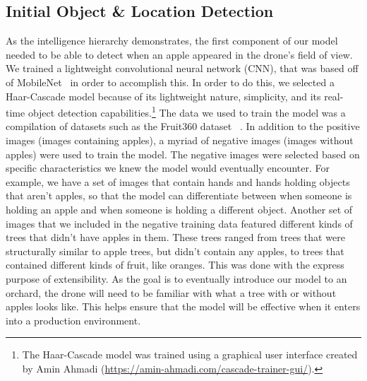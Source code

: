 \subsection{Initial Object \& Location Detection}\label{subsec:initial-object
-&-location-detection}
As the intelligence hierarchy demonstrates, the first component of our model needed
to be able to detect when an apple appeared in the drone's field of view.
We trained a lightweight convolutional neural network (CNN), that was based off of
MobileNet~\cite{Sandler2018,PyTorchMobileNet} in order to accomplish this.
In order to do this, we selected a Haar-Cascade model because of its lightweight
nature, simplicity, and its real-time object detection capabilities.\footnote{The
Haar-Cascade model was trained using a graphical user interface created by Amin
Ahmadi (\url{https://amin-ahmadi.com/cascade-trainer-gui/}).}
The data we used to train the model was a compilation of datasets such as the
Fruit360 dataset ~\cite{Fruit360}.
In addition to the positive images (images containing apples), a myriad of negative
images (images without apples) were used to train the model.
The negative images were selected based on specific characteristics we knew the model
would eventually encounter.
For example, we have a set of images that contain hands and hands holding
objects that aren't apples, so that the model can differentiate between when someone
is holding an apple and when someone is holding a different object.
Another set of images that we included in the negative training data featured
different kinds of trees that didn't have apples in them.
These trees ranged from trees that were structurally similar to apple trees, but
didn't contain any apples, to trees that contained different kinds of fruit, like
oranges.
This was done with the express purpose of extensibility.
As the goal is to eventually introduce our model to an orchard, the drone will need
to be familiar with what a tree with or without apples looks like.
This helps ensure that the model will be effective when it enters into a production
environment.
